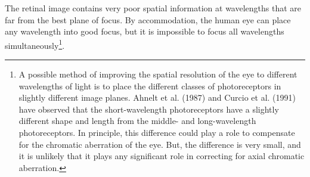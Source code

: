 The retinal image contains very poor spatial information
at wavelengths that are far from the best plane of focus.
By accommodation, the human eye can place any wavelength
into good focus, but it is impossible to focus
all wavelengths simultaneously\footnote{
A possible method of improving the spatial resolution of
the eye to different wavelengths of light is to place
the different classes of photoreceptors in slightly
different image planes.
Ahnelt et al. (1987) and Curcio et al. (1991) have observed that
the short-wavelength photoreceptors have a slightly
different shape and length from the middle- and
long-wavelength photoreceptors.
In principle, this difference could play a role to compensate
for the chromatic aberration of the eye.
But, the difference is very
small, and it is unlikely that it
plays any significant role in correcting for axial chromatic aberration.}.
\nocite{AhneltKolbPflug,Curcio}	%




